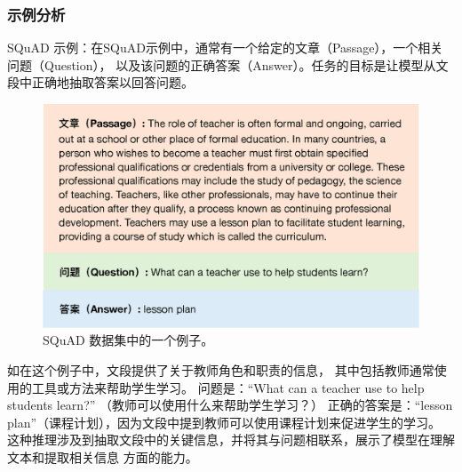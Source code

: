 \subsubsection*{示例分析}
SQuAD 示例：在SQuAD示例中，通常有一个给定的文章（Passage），一个相关问题（Question），
以及该问题的正确答案（Answer）。任务的目标是让模型从文段中正确地抽取答案以回答问题。

\begin{figure}[th]
  \centering\includegraphics[width=5in]{figures/xulun/squadexample.eps}
  \caption{SQuAD 数据集中的一个例子。}
  \label{fig1:squadexample}
  \end{figure}

如在这个例子中，文段提供了关于教师角色和职责的信息，
其中包括教师通常使用的工具或方法来帮助学生学习。
问题是：``What can a teacher use to help students learn?''
（教师可以使用什么来帮助学生学习？）
正确的答案是：``lesson plan''（课程计划），因为文段中提到教师可以使用课程计划来促进学生的学习。
这种推理涉及到抽取文段中的关键信息，并将其与问题相联系，展示了模型在理解文本和提取相关信息
方面的能力。

